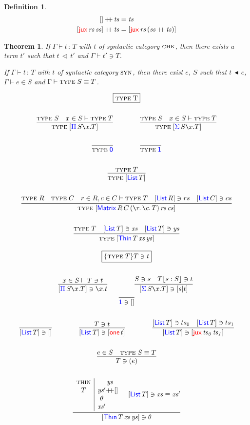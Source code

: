\documentclass[12pt, a4paper]{article}
\makeatletter
\newcommand{\bsl}{\texttt{\symbol{92}}}
\newcommand{\Type}{\textsc{type}\;}
\newcommand{\Zero}{\single{\D{0}}}
\newcommand{\One}{\single{\D{1}}}
\newcommand{\Nil}{\mathbf{[]}}
\newcommand{\Syn}{\textsc{syn}}
\newcommand{\Chk}{\textsc{chk}}
\newcommand{\gp}{\,}
\newcommand{\forms}[3]{
  \ifthenelse{\equal{{#2}}{}}
  {\textcolor{#3}{\gp {#1}}}
  {[\textcolor{#3}{#1}\gp {#2}]}
}
\newcommand{\typeIntro}[2]{\forms{#1}{#2}{blue}}
\newcommand{\Pair}[2]{[{#1}|{#2}]}
\newcommand{\subst}[2]{{#1}\lfloor {#2} \rfloor}
\newcommand{\C}[1]{\textcolor{red}{\mathsf{#1}}}
\newcommand{\D}[1]{\textcolor{blue}{\mathsf{#1}}}
\newcommand{\one}[1]{[ \C{one} \gp  {#1} ]}
\newcommand{\List}[1]{[ \D{List} \gp {#1} ]}
\newcommand{\Matrix}[7]{[ \D{Matrix} \gp {#1} \gp {#2} \gp ( \la{#3}\la{#4} {#5}) \gp {#6} \gp {#7}]}
\newcommand{\MRCT}[2]{\Matrix{R}{C}{r}{c}{T}{#1}{#2}}
\newcommand{\jux}[2]{[ \C{jux} \gp {#1} \gp {#2}]}
\newcommand{\Thin}[3]{[ \D{Thin} \gp {#1} \gp {#2} \gp {#3} ]}
\newcommand{\ctxValid}[1]{{#1} \vdash}
\newcommand{\ctxType}[2]{{#1} \vdash \Type {#2}}
\newcommand{\hasType}[3]{{#1} \vdash {#2} \hab {#3}}
\newcommand{\checkType}[2]{{#1} \ni {#2}}
\newcommand{\synthType}[2]{{#1} \in {#2}}
\newcommand{\checkThin}[6]{
  \begin{array}{c|c@{}c@{}c}
    \textsc{thin}&& {#2} &  \\
    {#1} & {#5} & +\!\!+ & {#6} \\
         & {#3} &        &      \\
         & {#4} &        &
  \end{array}
}
\newcommand{\hab}{\gp : \gp}
\newcommand{\la}[1]{\bsl{#1}.\,}
\newcommand{\V}[1]{\mathit{#1}}
\newcommand{\dplus}{\mathop{+\!\!+}}
\newcommand{\single}[1]{#1}
\newcommand{\chkrel}[2]{{#1} \gp \vartriangleleft \gp {#2}}
\newcommand{\synrel}[2]{{#1} \gp \blacktriangleleft \gp {#2}}
\newtheorem{thm}{Theorem}
\newtheorem{dfn}{Definition}
\makeatother
\begin{document}
\begin{dfn}
  \begin{align*}
    \Nil \dplus \V{ts} &= \V{ts}\\
    \jux{\V{rs}}{\V{ss}} \dplus \V{ts} &= \jux{\V{rs}}{(\V{ss} \dplus \V{ts})}
  \end{align*}
\end{dfn}


\begin{thm}
  If $\hasType{\Gamma}{t}{T}$ with $t$ of syntactic category $\Chk$, then there exists a term $t'$ such that $\chkrel{t}{t'}$ and $\ctxValid{\Gamma}\checkType{t'}{T}$.

  If $\hasType{\Gamma}{t}{T}$ with $t$ of syntactic category $\Syn$, then there exist $e$, $S$ such that $\synrel{t}{e}$, $\ctxValid{\Gamma}\synthType{e}{S}$ and $\ctxType{\Gamma}{S \equiv T}$.
\end{thm}



\begin{gather*}
  \fbox{\Type T}
  \\ \\
  \infer{\Type \typeIntro{\Pi}{S \bsl x . T}}{\Type S & x \in S \vdash \Type T}
  \qquad\qquad
  \infer{\Type \typeIntro{\Sigma}{S \bsl x . T}}{\Type S & x \in S \vdash \Type T}
  \\ \\
  \infer{\Type \Zero}{}
  \qquad\qquad
  \infer{\Type \One}{}
  \\ \\
  \infer{\Type \List{T}}{\Type T}
  \\ \\
  \infer{\Type \MRCT{\V{rs}}{\V{cs}}}{
    \Type R & \Type C & r \in R, c \in C \vdash \Type T
    & \List{R} \ni rs & \List{C} \ni cs
  }
  \\ \\
  \infer{\Type \Thin{T}{\V{xs}}{\V{ys}}}{\Type T & \List{T} \ni \V{xs} & \List{T} \ni \V{ys}}
\end{gather*}

\begin{gather*}
  \fbox{$\{\Type T\} \checkType{T}{t}$}
  \\ \\
  \infer{\typeIntro{\Pi}{S \bsl x . T} \ni \bsl x. t}{x \in S \vdash T \ni t}
  \qquad\qquad
  \infer{\typeIntro{\Sigma}{S \bsl x . T} \ni \Pair{s}{t}}{S \ni s & \subst{T}{s:S} \ni t}
  \ \\
  \infer{\One \ni \Nil}{}
  \\ \\
  \infer{\List{T} \ni \Nil}{} \qquad\qquad
  \infer{\List{T} \ni \one{t}}{T \ni t}
  \qquad\qquad \infer{\List{T} \ni \jux{\V{ts_{0}}}{\V{ts_{1}}}}{\List{T} \ni ts_{0} & \List{T} \ni  ts_{1}}
  \\ \\
  \infer{T \ni (e)}{e \in S & \Type S \equiv T}
  \\ \\
  \infer{\checkType{\Thin{T}{\V{xs}}{\V{ys}}}{\theta}}{\checkThin{T}{\V{ys}}{\theta}{\V{xs}'}{\V{ys}'}{\Nil} & \checkType{\List{T}}{\V{xs}\equiv\V{xs}'}}
\end{gather*}
\end{document}
